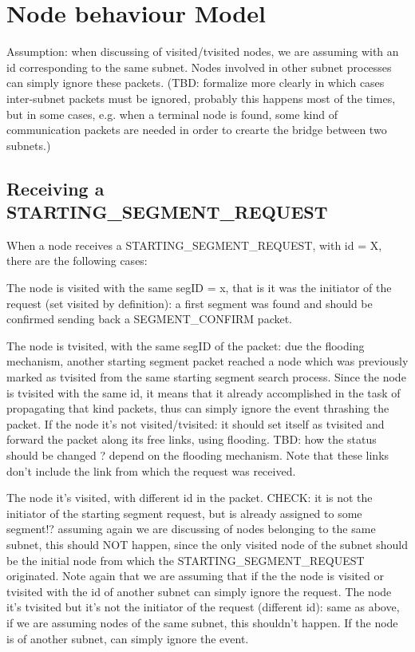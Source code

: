 \documentclass[conference]{IEEEtran}
\begin{document}
\section{Node behaviour Model}
Assumption: when discussing of
visited/tvisited nodes, we are assuming with an id corresponding to
the same subnet. Nodes involved in other subnet processes can simply
ignore these packets. (TBD: formalize more clearly in which cases
inter-subnet packets must be ignored, probably this happens most of
the times, but in some cases, e.g. when a terminal node is found, some
kind of communication packets are needed in order to crearte the
bridge between two subnets.) 

\subsection{Receiving a STARTING_SEGMENT_REQUEST}

When a node receives a STARTING_SEGMENT_REQUEST, with id = X,  there are the following cases:

The node is visited with the same segID = x, that is it was the
initiator of the request (set visited by definition): a first segment
was found and should be confirmed sending back a SEGMENT_CONFIRM
packet.  

The node is tvisited, with the same segID of the packet: due
the flooding mechanism, another starting segment packet reached a node
which was previously marked as tvisited from the same starting segment
search process. Since the node is tvisited with the same id, it means
that it already accomplished in the task of propagating that kind
packets, thus can simply ignore the event thrashing the packet.  If
the node it's not visited/tvisited: it should set itself as tvisited
and forward the packet along its free links, using flooding. TBD: how
the status should be changed ? depend on the flooding mechanism. Note
that these links don’t include the link from which the request was
received.  

The node it's visited, with different id in the packet.
CHECK:  it is not the initiator of the starting segment request, but
is already assigned to some segment!? assuming again we are discussing
of nodes belonging to the same subnet, this should NOT happen, since
the only visited node of the subnet should be the initial node from
which the STARTING_SEGMENT_REQUEST originated. Note again that we are
assuming that if the the node is visited or tvisited with the id of
another subnet can simply ignore the request.  The node it's tvisited
but it's not the initiator of the request (different id): same as
above, if we are assuming nodes of the same subnet, this shouldn’t
happen. If the node is of another subnet, can simply ignore the event.
\end{document}
